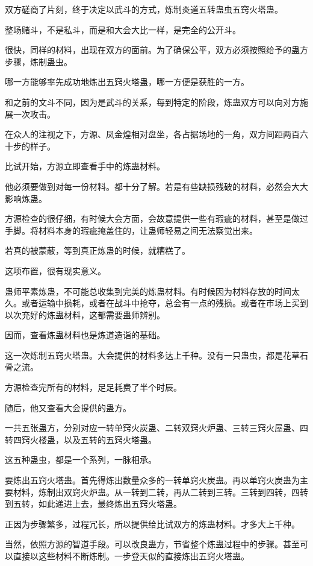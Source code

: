 \begin{this_body}
双方磋商了片刻，终于决定以武斗的方式，炼制炎道五转蛊虫五窍火塔蛊。

整场赌斗，不是私斗，而是和大会大比一样，是完全的公开斗。

很快，同样的材料，出现在双方的面前。为了确保公平，双方必须按照给予的蛊方步骤，炼制蛊虫。

哪一方能够率先成功地炼出五窍火塔蛊，哪一方便是获胜的一方。

和之前的文斗不同，因为是武斗的关系，每到特定的阶段，炼蛊双方可以向对方施展一次攻击。

在众人的注视之下，方源、凤金煌相对盘坐，各占据场地的一角，双方间距两百六十步的样子。

比试开始，方源立即查看手中的炼蛊材料。

他必须要做到对每一份材料。都十分了解。若是有些缺损残破的材料，必然会大大影响炼蛊。

方源检查的很仔细，有时候大会方面，会故意提供一些有瑕疵的材料，甚至是做过手脚。将材料本身的瑕疵掩盖住的，让蛊师轻易之间无法察觉出来。

若真的被蒙蔽，等到真正炼蛊的时候，就糟糕了。

这项布置，很有现实意义。

蛊师平素炼蛊，不可能总收集到完美的炼蛊材料。有时候因为材料存放的时间太久。或者运输中损耗，或者在战斗中抢夺，总会有一点的残损。或者在市场上买到以次充好的炼蛊材料，这都需要蛊师辨别。

因而，查看炼蛊材料也是炼道造诣的基础。

这一次炼制五窍火塔蛊。大会提供的材料多达上千种。没有一只蛊虫，都是花草石骨之流。

方源检查完所有的材料，足足耗费了半个时辰。

随后，他又查看大会提供的蛊方。

一共五张蛊方，分别对应一转单窍火炭蛊、二转双窍火炉蛊、三转三窍火屋蛊、四转四窍火楼蛊，以及五转的五窍火塔蛊。

这五种蛊虫，都是一个系列，一脉相承。

要炼出五窍火塔蛊。首先得炼出数量众多的一转单窍火炭蛊。再以单窍火炭蛊为主要材料，炼制出双窍火炉蛊。从一转到二转，再从二转到三转。三转到四转，四转到五转，如此递进上去，最终炼出五窍火塔蛊。

正因为步骤繁多，过程冗长，所以提供给比试双方的炼蛊材料。才多大上千种。

当然，依照方源的智道手段。可以改良蛊方，节省整个炼蛊过程中的步骤。甚至可以直接以这些材料不断炼制。一步登天似的直接炼出五窍火塔蛊。


\end{this_body}
